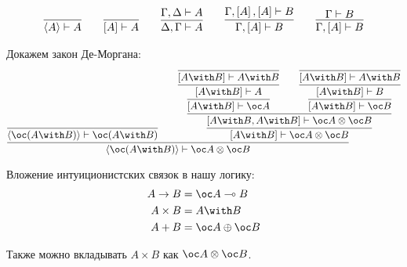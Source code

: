 \begin{gather*}
    \infer{\left<A\right> \vdash A}{} \qquad
    \infer{\left[A\right] \vdash A}{} \qquad
    \infer{\Delta, \Gamma \vdash A}{\Gamma, \Delta \vdash A} \qquad
    \infer{\Gamma, \left[A\right] \vdash B}{\Gamma, \left[A\right], \left[A\right] \vdash B} \qquad
    \infer{\Gamma, \left[A\right] \vdash B}{\Gamma \vdash B} \\
\end{gather*}

Докажем закон Де-Моргана:
\[
    \infer{\left<\oc (A \with B)\right> \vdash \oc A \otimes \oc B} {
        \infer{\left<\oc (A \with B)\right> \vdash \oc (A \with B)}{}
        &&
        \infer{\left[A \with B\right] \vdash \oc A \otimes \oc B} {
            \infer{\left[A \with B, A \with B\right] \vdash \oc A \otimes \oc B}{
                \infer{\left[A \with B\right] \vdash \oc A} {
                    \infer{\left[A \with B\right] \vdash A} {
                        \infer{\left[A \with B \right] \vdash A \with B}{}
                    }
                }
                &&
                \infer{\left[A \with B\right] \vdash \oc B} {
                    \infer{\left[A \with B\right] \vdash B} {
                        \infer{\left[A \with B \right] \vdash A \with B}{}
                    }
                }
            }
        }
    }
\]

Вложение интуиционистских связок в нашу логику:
\begin{align*}
    A \rightarrow B &= \oc A \multimap B \\
    A \times B      &= A \with B \\
    A + B           &= \oc A \oplus \oc B
\end{align*}

Также можно вкладывать $A \times B$ как $\oc A \otimes \oc B$.
